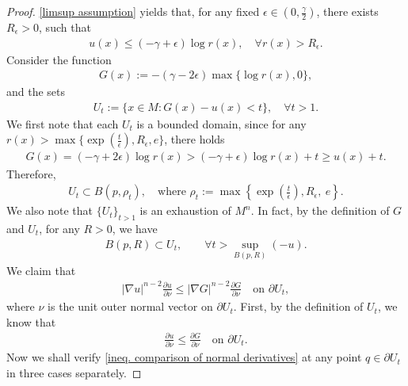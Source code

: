 \documentclass[12pt]{amsart}
\theoremstyle{plain}
\theoremstyle{definition}
\theoremstyle{remark}     %
\begin{document}
\begin{proof}
    \cref{limsup assumption} yields that,
    for any fixed $\epsilon\in (0,\frac{\gamma}{2})$,  there exists $R_\epsilon>0$, such that
    \begin{align*}
        u(x)\leq (-\gamma+\epsilon)\log r(x),\quad 
        \forall r(x)>R_\epsilon.
    \end{align*}
    Consider the function
    \begin{align*}
        G(x):=-(\gamma-2\epsilon)
        \max\{\log r(x),0\},
    \end{align*}
    and the sets
    \begin{align*}
        U_t:=\{x\in M: G(x)-u(x)<t\},\quad \forall t>1.
    \end{align*}
    We first note that  each $U_t$ is a bounded domain, since for any $ r(x)>\max\{{\exp(\frac{t}{\epsilon})}, R_\epsilon, e\}$, there holds
    \begin{align*}
        G(x)
        =(-\gamma+2\epsilon)\log r(x)
        > (-\gamma+\epsilon)\log r(x)+t
        \geq u(x)+t.
    \end{align*}
    Therefore,
    \begin{align}\label{Ut is bounded}
        U_t\subset B(p,\rho_t),\quad 
        \text{where }\rho_t:=
        \max\left\{
        {\exp\left({\frac{t}{\epsilon}}\right)},R_\epsilon,\ e
        \right\}.
    \end{align}
    We also note that $\{U_t\}_{t>1}$ is an exhaustion of $M^n$. In fact, by the definition of $G$ and $U_t$, for any $R>0$, we have
    \begin{align*}
        B(p,R)\subset U_t,\qquad \forall 
        t>\sup_{B(p,R)}(-u).
    \end{align*}
    We claim that
    \begin{align}\label{ineq. comparison of normal derivatives}
        |\nabla u|^{n-2}\frac{\partial u}{\partial\nu}
        \leq |\nabla G|^{n-2}\frac{\partial G}{\partial\nu}\quad 
        \text{on }\partial U_t,
    \end{align}
    where $\nu$ is the unit outer normal vector on $\partial U_t$. First, by the definition of $U_t$, we know that
    \begin{align*}
        \frac{\partial u}{\partial \nu}
        \leq \frac{\partial G}{\partial\nu}
        \quad \text{on }\partial U_t.
    \end{align*}
    Now we shall verify \cref{ineq. comparison of normal derivatives} at any point $q\in\partial U_t$ in three cases separately.
    

\end{proof}
\end{document}
